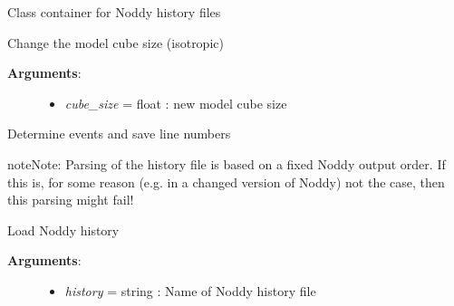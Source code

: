 \documentclass[letterpaper,10pt,english]{sphinxmanual}
\begin{document}
\begin{fulllineitems}
\label{pynoddy:pynoddy.history.NoddyHistory}
Class container for Noddy history files

\begin{fulllineitems}
\label{pynoddy:pynoddy.history.NoddyHistory.change_cube_size}
Change the model cube size (isotropic)
\begin{description}
\item[{\textbf{Arguments}:}] \leavevmode\begin{itemize}
\item {} 
\emph{cube\_size} = float : new model cube size

\end{itemize}

\end{description}

\end{fulllineitems}


\begin{fulllineitems}
\label{pynoddy:pynoddy.history.NoddyHistory.determine_events}
Determine events and save line numbers

\begin{notice}{note}{Note:}
Parsing of the history file is based on a fixed Noddy output order. 
If this is, for some reason (e.g. in a changed version of Noddy) not the case, then
this parsing might fail!
\end{notice}

\end{fulllineitems}


\begin{fulllineitems}
\label{pynoddy:pynoddy.history.NoddyHistory.load_history}
Load Noddy history
\begin{description}
\item[{\textbf{Arguments}:}] \leavevmode\begin{itemize}
\item {} 
\emph{history} = string : Name of Noddy history file


\end{itemize}
\end{description}
\end{fulllineitems}
\end{fulllineitems}
\end{document}
